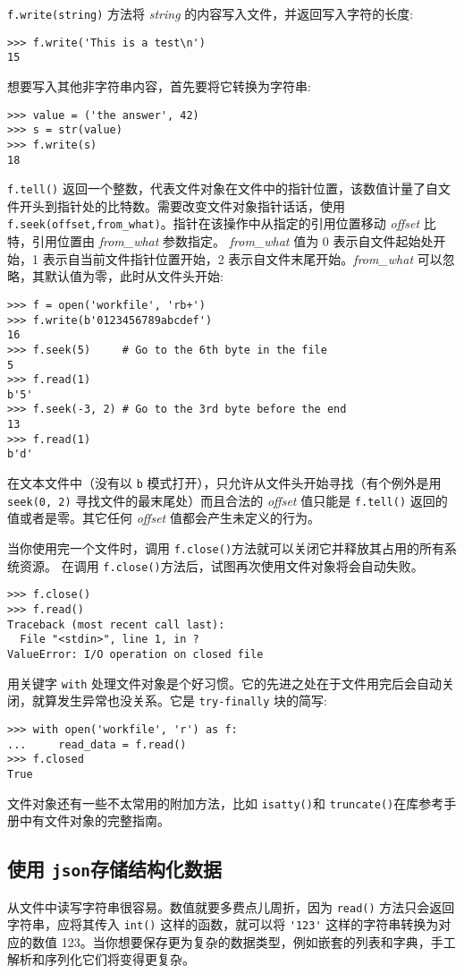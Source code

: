 \texttt{f.write(string)} 方法将 \textit{string} 的内容写入文件，并返回写入字符的长度:
\begin{lstlisting}
>>> f.write('This is a test\n')
15
\end{lstlisting}
想要写入其他非字符串内容，首先要将它转换为字符串:
\begin{lstlisting}
>>> value = ('the answer', 42)
>>> s = str(value)
>>> f.write(s)
18
\end{lstlisting}
\texttt{f.tell()} 返回一个整数，代表文件对象在文件中的指针位置，该数值计量了自文件开头到指针处的比特数。需要改变文件对象指针话话，使用 \cprotect\texttt{f.seek(offset,\verb|from_what|)}。指针在该操作中从指定的引用位置移动 \textit{offset} 比特，引用位置由 \textit{from\_what} 参数指定。 \textit{from\_what} 值为 0 表示自文件起始处开始，1 表示自当前文件指针位置开始，2 表示自文件末尾开始。\textit{from\_what} 可以忽略，其默认值为零，此时从文件头开始:
\begin{lstlisting}
>>> f = open('workfile', 'rb+')
>>> f.write(b'0123456789abcdef')
16
>>> f.seek(5)     # Go to the 6th byte in the file
5
>>> f.read(1)
b'5'
>>> f.seek(-3, 2) # Go to the 3rd byte before the end
13
>>> f.read(1)
b'd'
\end{lstlisting}
在文本文件中（没有以 \verb|b| 模式打开），只允许从文件头开始寻找（有个例外是用 \texttt{seek(0, 2)} 寻找文件的最末尾处）而且合法的 \textit{offset} 值只能是 \texttt{f.tell()} 返回的值或者是零。其它任何 \textit{offset} 值都会产生未定义的行为。

当你使用完一个文件时，调用 \texttt{f.close()}方法就可以关闭它并释放其占用的所有系统资源。 在调用 \texttt{f.close()}方法后，试图再次使用文件对象将会自动失败。
\begin{lstlisting}
>>> f.close()
>>> f.read()
Traceback (most recent call last):
  File "<stdin>", line 1, in ?
ValueError: I/O operation on closed file
\end{lstlisting}
用关键字 \texttt{with} 处理文件对象是个好习惯。它的先进之处在于文件用完后会自动关闭，就算发生异常也没关系。它是 \texttt{try-finally} 块的简写:
\begin{lstlisting}
>>> with open('workfile', 'r') as f:
...     read_data = f.read()
>>> f.closed
True
\end{lstlisting}
文件对象还有一些不太常用的附加方法，比如 \texttt{isatty()}和 \texttt{truncate()}在库参考手册中有文件对象的完整指南。
\subsection{使用 \texttt{json}存储结构化数据}
从文件中读写字符串很容易。数值就要多费点儿周折，因为 \texttt{read()} 方法只会返回字符串，应将其传入 \texttt{int()} 这样的函数，就可以将 \verb|'123'| 这样的字符串转换为对应的数值 123。当你想要保存更为复杂的数据类型，例如嵌套的列表和字典，手工解析和序列化它们将变得更复杂。

